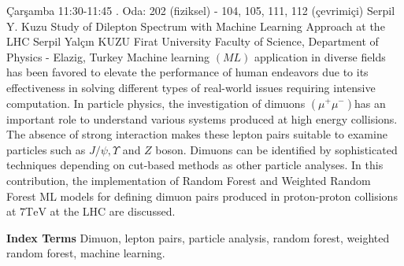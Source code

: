 
    \begin{abstract_basarim}
    {Çarşamba 11:30-11:45}
    {.}
    {Oda: 202 (fiziksel) - 104, 105, 111, 112 (çevrimiçi)}
    {Serpil Y. Kuzu}
    {Study of Dilepton Spectrum with Machine Learning Approach at the LHC}
    {%
    Serpil Yalçın KUZU}
    {%
    }
    {%
    Firat University Faculty of Science, Department of Physics - Elazig, Turkey}
    Machine learning $(M L)$ application in diverse fields has been favored to elevate the performance of human endeavors due to its effectiveness in solving different types of real-world issues requiring intensive computation. In particle physics, the investigation of dimuons $\left(\mu^{+} \mu^{-}\right)$has an important role to understand various systems produced at high energy collisions. The absence of strong interaction makes these lepton pairs suitable to examine particles such as $J / \psi, \Upsilon$ and $Z$ boson. Dimuons can be identified by sophisticated techniques depending on cut-based methods as other particle analyses. In this contribution, the implementation of Random Forest and Weighted Random Forest ML models for defining dimuon pairs produced in proton-proton collisions at $7 \mathrm{TeV}$ at the LHC are discussed. 
    
            \textbf{Index Terms} \newline{}Dimuon, lepton pairs, particle analysis, random forest, weighted random forest, machine learning.
    \end{abstract_basarim}
    